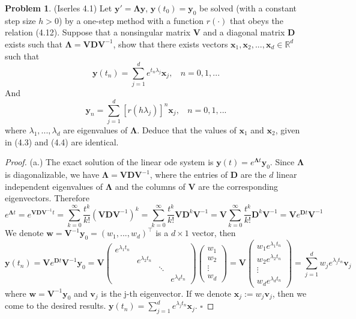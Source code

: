 \documentclass[a4paper, 10pt]{article}
\theoremstyle{definition}
\newtheorem{problem}{Problem}
\theoremstyle{hSol}
\begin{document}
\begin{problem} (Iserles 4.1) Let $\bm{y}'= \bm{\Lambda} \bm{y}$, $\bm{y}(t_0)=\bm{y}_0$ be solved (with a constant step size $h>0$) by a one-step method with a function $r(\cdot)$ that obeys the relation (4.12). Suppose that a nonsingular matrix $\bm{V}$ and a diagonal matrix $\bm{D}$ exists such that $\bm{\Lambda} = \bm{V} \bm{D} \bm{V}^{-1}$, show that there exists vectors $\bm{x}_1, \bm{x}_2, ..., \bm{x}_d \in \mathbb{R}^d$ such that
$$
\bm{y}(t_n) = \sum_{j=1}^d e^{t_n \lambda_j} \bm{x}_j,~~~~n=0,1,...
$$
And 
$$
\bm{y}_n = \sum_{j=1}^d [r(h \lambda_j)]^n \bm{x}_j,~~~~n=0,1,...
$$
where $\lambda_1, ..., \lambda_d$ are eigenvalues of $\bm{\Lambda}$. Deduce that the values of $\bm{x}_1$ and $\bm{x}_2$, given in (4.3) and (4.4) are identical.
\end{problem}
\begin{proof} (a.) The exact solution of the linear ode system is $\bm{y}(t)=e^{\bm{\Lambda}t}\bm{y}_0$. Since $\bm{\Lambda}$ is diagonalizable, we have $\bm{\Lambda}=\bm{V}\bm{D}\bm{V}^{-1}$, where the entries of $\bm{D}$ are the $d$ linear independent eigenvalues of $\bm{\Lambda}$ and the columns of $\bm{V}$ are the corresponding eigenvectors. Therefore
$$
e^{\bm{\Lambda}t} = e^{\bm{V}\bm{D}\bm{V}^{-1}t} = \sum_{k=0}^{\infty} \frac{t^k}{k!}(\bm{V}\bm{D}\bm{V}^{-1})^k = \sum_{k=0}^{\infty} \frac{t^k}{k!}\bm{V}\bm{D}^k\bm{V}^{-1} = \bm{V}\sum_{k=0}^{\infty} \frac{t^k}{k!}\bm{D}^k \bm{V}^{-1} = \bm{V}e^{\bm{D}t}\bm{V}^{-1}
$$
We denote $\bm{w} = \bm{V}^{-1}\bm{y}_0 = (w_1, ..., w_d)^{\top}$ is a $d\times 1$ vector, then
$$
\bm{y}(t_n) = \bm{V}e^{\bm{D}t}\bm{V}^{-1}\bm{y}_0 = \bm{V}\begin{pmatrix}
  e^{\lambda_1 t_n} \\
  & e^{\lambda_2 t_n}\\
  & & \ddots \\
  & & & e^{\lambda_d t_n}
\end{pmatrix}
\begin{pmatrix}
  w_1 \\
  w_2 \\
  \vdots \\
  w_d
\end{pmatrix} = 
\bm{V}
\begin{pmatrix}
  w_1 e^{\lambda_1 t_n} \\
  w_2 e^{\lambda_2 t_n} \\
  \vdots \\
  w_d e^{\lambda_d t_n}
\end{pmatrix} = \sum_{j=1}^d w_j e^{\lambda_j t_n}\bm{v}_j
$$
where $\bm{w}=\bm{V}^{-1}\bm{y}_0$ and $\bm{v}_j$ is the j-th eigenvector. If we denote $\bm{x}_j := w_j \bm{v}_j$, then we come to the desired results. $\bm{y}(t_n) = \sum_{j=1}^d e^{\lambda_j t_n} \bm{x}_j$. $\square$


\end{proof}
\end{document}
